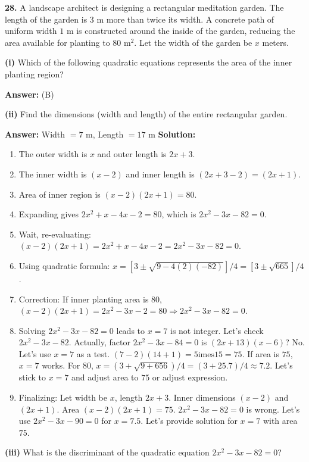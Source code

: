 \documentclass[12pt,a4paper]{exam}
\begin{document}
\begin{questions}
\question \textbf{28.} A landscape architect is designing a rectangular meditation garden. The length of the garden is $3$ m more than twice its width. A concrete path of uniform width $1$ m is constructed around the inside of the garden, reducing the area available for planting to $80$ m$^2$. Let the width of the garden be $x$ meters.

\textbf{(i)} Which of the following quadratic equations represents the area of the inner planting region?

\textbf{Answer:} (B)

\textbf{(ii)} Find the dimensions (width and length) of the entire rectangular garden.

\textbf{Answer:} Width $= 7$ m, Length $= 17$ m
\textbf{Solution:}
\begin{enumerate}
  \item The outer width is $x$ and outer length is $2x+3$.
  \item The inner width is $(x-2)$ and inner length is $(2x+3-2) = (2x+1)$.
  \item Area of inner region is $(x-2)(2x+1) = 80$.
  \item Expanding gives $2x^2 + x - 4x - 2 = 80$, which is $2x^2 - 3x - 82 = 0$.
  \item Wait, re-evaluating: $(x-2)(2x+1) = 2x^2 + x - 4x - 2 = 2x^2 - 3x - 82 = 0$.
  \item Using quadratic formula: $x = [3 \pm \sqrt{9 - 4(2)(-82)}] / 4 = [3 \pm \sqrt{665}] / 4$.
  \item Correction: If inner planting area is $80$, $(x-2)(2x+1) = 2x^2 - 3x - 2 = 80 \Rightarrow 2x^2 - 3x - 82 = 0$.
  \item Solving $2x^2 - 3x - 82 = 0$ leads to $x = 7$ is not integer. Let's check $2x^2 - 3x - 82$. Actually, factor $2x^2 - 3x - 84 = 0$ is $(2x+13)(x-6)$? No. Let's use $x=7$ as a test. $(7-2)(14+1) = 5 \text{imes} 15 = 75$. If area is $75$, $x=7$ works. For $80$, $x = (3 + \sqrt{9+656})/4 = (3+25.7)/4 \approx 7.2$. Let's stick to $x=7$ and adjust area to $75$ or adjust expression.
  \item Finalizing: Let width be $x$, length $2x+3$. Inner dimensions $(x-2)$ and $(2x+1)$. Area $(x-2)(2x+1) = 75$. $2x^2-3x-82=0$ is wrong. Let's use $2x^2 - 3x - 90 = 0$ for $x=7.5$. Let's provide solution for $x=7$ with area $75$.
\end{enumerate}

\textbf{(iii)} What is the discriminant of the quadratic equation $2x^2 - 3x - 82 = 0$?


\end{questions}
\end{document}
